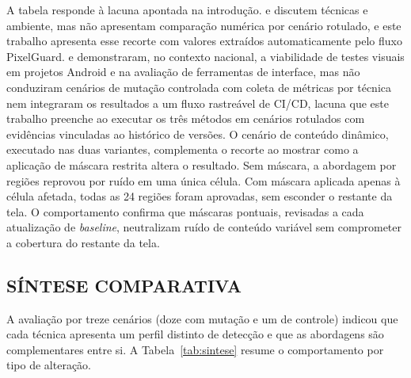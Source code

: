 \documentclass{UNESC}
\begin{document}
A tabela responde à lacuna apontada na introdução.  e  discutem técnicas e ambiente, mas não apresentam comparação numérica por cenário rotulado, e este trabalho apresenta esse recorte com valores extraídos automaticamente pelo fluxo PixelGuard.  e  demonstraram, no contexto nacional, a viabilidade de testes visuais em projetos Android e na avaliação de ferramentas de interface, mas não conduziram cenários de mutação controlada com coleta de métricas por técnica nem integraram os resultados a um fluxo rastreável de CI/CD, lacuna que este trabalho preenche ao executar os três métodos em cenários rotulados com evidências vinculadas ao histórico de versões. O cenário de conteúdo dinâmico, executado nas duas variantes, complementa o recorte ao mostrar como a aplicação de máscara restrita altera o resultado. Sem máscara, a abordagem por regiões reprovou por ruído em uma única célula. Com máscara aplicada apenas à célula afetada, todas as 24 regiões foram aprovadas, sem esconder o restante da tela. O comportamento confirma que máscaras pontuais, revisadas a cada atualização de \emph{baseline}, neutralizam ruído de conteúdo variável sem comprometer a cobertura do restante da tela.

\subsection{SÍNTESE COMPARATIVA}
A avaliação por treze cenários (doze com mutação e um de controle) indicou que cada técnica apresenta um perfil distinto de detecção e que as abordagens são complementares entre si. A Tabela~\ref{tab:sintese} resume o comportamento por tipo de alteração.
\end{document}

